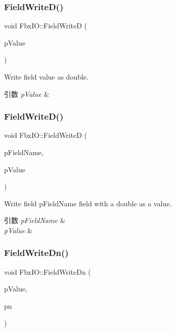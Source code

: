 \subsubsection{\texorpdfstring{Field\+Write\+D()}{FieldWriteD()}\hspace{0.1cm}{\footnotesize\ttfamily [1/2]}}
{\footnotesize\ttfamily void Fbx\+I\+O\+::\+Field\+WriteD (\begin{DoxyParamCaption}\item[{double}]{p\+Value }\end{DoxyParamCaption})}

Write field value as double. 
\begin{DoxyParams}{引数}
{\em p\+Value} & \\
\hline
\end{DoxyParams}
\mbox{\label{class_fbx_i_o_a139783b3c68372360ba97acb927ede2d}} 
\subsubsection{\texorpdfstring{Field\+Write\+D()}{FieldWriteD()}\hspace{0.1cm}{\footnotesize\ttfamily [2/2]}}
{\footnotesize\ttfamily void Fbx\+I\+O\+::\+Field\+WriteD (\begin{DoxyParamCaption}\item[{const char $\ast$}]{p\+Field\+Name,  }\item[{double}]{p\+Value }\end{DoxyParamCaption})}

Write field p\+Field\+Name field with a double as a value. 
\begin{DoxyParams}{引数}
{\em p\+Field\+Name} & \\
\hline
{\em p\+Value} & \\
\hline
\end{DoxyParams}
\mbox{\label{class_fbx_i_o_a8cd415bcad232d9982183c4bbdee1931}} 
\subsubsection{\texorpdfstring{Field\+Write\+Dn()}{FieldWriteDn()}\hspace{0.1cm}{\footnotesize\ttfamily [1/2]}}
{\footnotesize\ttfamily void Fbx\+I\+O\+::\+Field\+Write\+Dn (\begin{DoxyParamCaption}\item[{const double $\ast$}]{p\+Value,  }\item[{\hyperlink{fbxtypes_8h_ae9fb141d8158a730aa85ec5ff2ea3f6b}{Fbx\+U\+Int}}]{pn }\end{DoxyParamCaption})}

